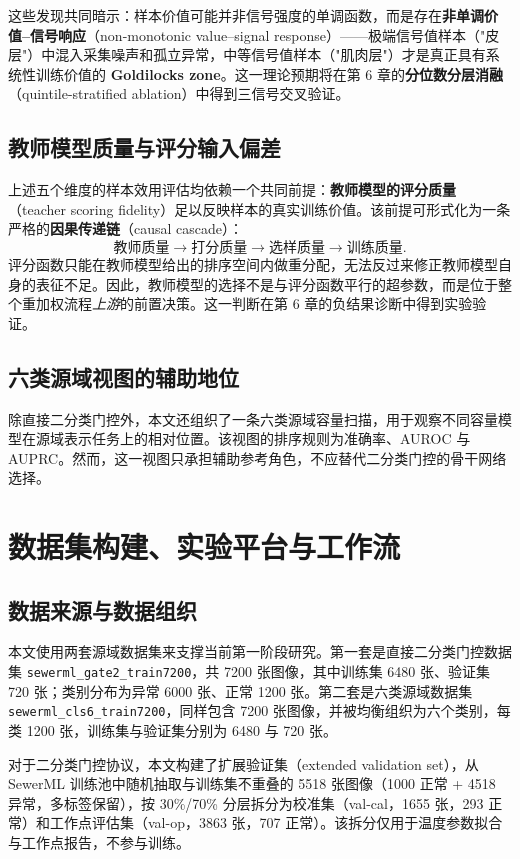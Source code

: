 \documentclass[UTF8,openany,12pt]{ctexbook}
\begin{document}
这些发现共同暗示：样本价值可能并非信号强度的单调函数，而是存在\textbf{非单调价值--信号响应}（non-monotonic value--signal response）——极端信号值样本（"皮层"）中混入采集噪声和孤立异常，中等信号值样本（"肌肉层"）才是真正具有系统性训练价值的 \textbf{Goldilocks zone}。这一理论预期将在第 6 章的\textbf{分位数分层消融}（quintile-stratified ablation）中得到三信号交叉验证。

\section{教师模型质量与评分输入偏差}
上述五个维度的样本效用评估均依赖一个共同前提：\textbf{教师模型的评分质量}（teacher scoring fidelity）足以反映样本的真实训练价值。该前提可形式化为一条严格的\textbf{因果传递链}（causal cascade）：
\begin{equation}
\text{教师质量} \longrightarrow \text{打分质量} \longrightarrow \text{选样质量} \longrightarrow \text{训练质量}.
\label{eq:teacher-cascade}
\end{equation}
评分函数只能在教师模型给出的排序空间内做重分配，无法反过来修正教师模型自身的表征不足。因此，教师模型的选择不是与评分函数平行的超参数，而是位于整个重加权流程\emph{上游}的前置决策。这一判断在第 6 章的负结果诊断中得到实验验证。

\section{六类源域视图的辅助地位}
除直接二分类门控外，本文还组织了一条六类源域容量扫描，用于观察不同容量模型在源域表示任务上的相对位置。该视图的排序规则为准确率、AUROC 与 AUPRC。然而，这一视图只承担辅助参考角色，不应替代二分类门控的骨干网络选择。

\chapter{数据集构建、实验平台与工作流}

\section{数据来源与数据组织}
本文使用两套源域数据集来支撑当前第一阶段研究。第一套是直接二分类门控数据集 \texttt{sewerml\_gate2\_train7200}，共 7200 张图像，其中训练集 6480 张、验证集 720 张；类别分布为异常 6000 张、正常 1200 张。第二套是六类源域数据集 \texttt{sewerml\_cls6\_train7200}，同样包含 7200 张图像，并被均衡组织为六个类别，每类 1200 张，训练集与验证集分别为 6480 与 720 张。

对于二分类门控协议，本文构建了扩展验证集（extended validation set），从 SewerML 训练池中随机抽取与训练集不重叠的 5518 张图像（1000 正常 + 4518 异常，多标签保留），按 30\%/70\% 分层拆分为校准集（val-cal，1655 张，293 正常）和工作点评估集（val-op，3863 张，707 正常）。该拆分仅用于温度参数拟合与工作点报告，不参与训练。
\end{document}
